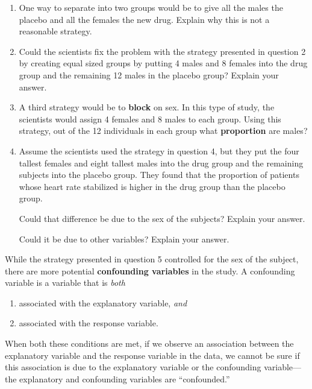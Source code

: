 \documentclass[
]{report}
\providecommand{\tightlist}{%
  \setlength{\itemsep}{0pt}\setlength{\parskip}{0pt}}
\begin{document}
\begin{enumerate}
\def\labelenumi{\arabic{enumi}.}
\setcounter{enumi}{1}
\item
  One way to separate into two groups would be to give all the males the placebo and all the females the new drug. Explain why this is not a reasonable strategy.
  \vspace{1in}
\item
  Could the scientists fix the problem with the strategy presented in question 2 by creating equal sized groups by putting 4 males and 8 females into the drug group and the remaining 12 males in the placebo group? Explain your answer.
  \vspace{0.5in}
\item
  A third strategy would be to \textbf{block} on sex. In this type of study, the scientists would assign 4 females and 8 males to each group. Using this strategy, out of the 12 individuals in each group what \textbf{proportion} are males?
  \vspace{0.3in}
\item
  Assume the scientists used the strategy in question 4, but they put the four tallest females and eight tallest males into the drug group and the remaining subjects into the placebo group. They found that the proportion of patients whose heart rate stabilized is higher in the drug group than the placebo group.\\
  \vspace{0.1in}

  Could that difference be due to the sex of the subjects? Explain your answer.
  \vspace{0.5in}

  Could it be due to other variables? Explain your answer.
  \vspace{0.5in}
\end{enumerate}

While the strategy presented in question 5 controlled for the sex of the subject, there are more potential \textbf{confounding variables} in the study. A confounding variable is a variable that is \emph{both}

\begin{enumerate}
\def\labelenumi{\arabic{enumi}.}
\tightlist
\item
  associated with the explanatory variable, \emph{and}
\item
  associated with the response variable.
\end{enumerate}

When both these conditions are met, if we observe an association between the explanatory variable and the response variable in the data, we cannot be sure if this association is due to the explanatory variable or the confounding variable---the explanatory and confounding variables are ``confounded.''
\end{document}

